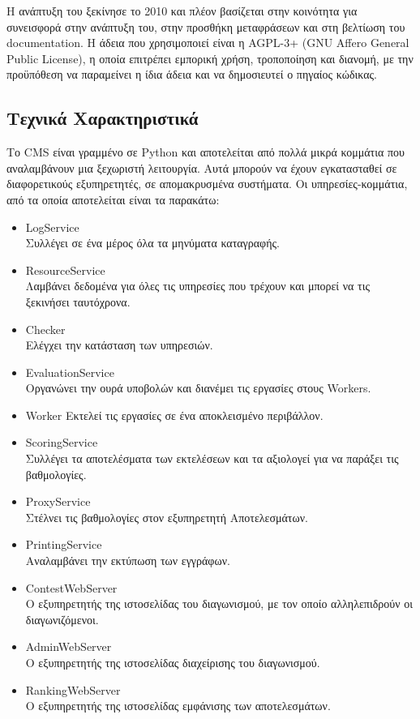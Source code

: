 \documentclass[diploma]{softlab-thesis}
\begin{document}
\bigskip

Η ανάπτυξη του ξεκίνησε το 2010 και πλέον βασίζεται στην κοινότητα για
συνεισφορά στην ανάπτυξη του, στην προσθήκη μεταφράσεων και στη βελτίωση του
documentation. H άδεια που χρησιμοποιεί είναι η AGPL-3+ (GNU Affero General
Public License), η οποία επιτρέπει εμπορική χρήση, τροποποίηση και διανομή, με
την προϋπόθεση να παραμείνει η ίδια άδεια και να δημοσιευτεί ο πηγαίος κώδικας.

\subsection{Τεχνικά Χαρακτηριστικά}

Το CMS είναι γραμμένο σε Python και αποτελείται από πολλά μικρά κομμάτια που
αναλαμβάνουν μια ξεχωριστή λειτουργία. Αυτά μπορούν να έχουν εγκατασταθεί σε
διαφορετικούς εξυπηρετητές, σε απομακρυσμένα συστήματα. Οι υπηρεσίες-κομμάτια, από
τα οποία αποτελείται είναι τα παρακάτω:

\begin{itemize}
    \setlength\itemsep{0em}
    \item LogService \\
      Συλλέγει σε ένα μέρος όλα τα μηνύματα καταγραφής.
    \item ResourceService \\
      Λαμβάνει δεδομένα για όλες τις υπηρεσίες που τρέχουν και μπορεί να τις
      ξεκινήσει ταυτόχρονα.
    \item Checker \\
      Ελέγχει την κατάσταση των υπηρεσιών.
    \item EvaluationService \\
      Οργανώνει την ουρά υποβολών και διανέμει τις εργασίες στους Workers.
    \item Worker
      Εκτελεί τις εργασίες σε ένα αποκλεισμένο περιβάλλον.
    \item ScoringService \\
      Συλλέγει τα αποτελέσματα των εκτελέσεων και τα αξιολογεί για να παράξει
      τις βαθμολογίες.
    \item ProxyService \\
      Στέλνει τις βαθμολογίες στον εξυπηρετητή Αποτελεσμάτων.
    \item PrintingService \\
      Αναλαμβάνει την εκτύπωση των εγγράφων.
    \item ContestWebServer \\
      Ο εξυπηρετητής της ιστοσελίδας του διαγωνισμού, με τον οποίο αλληλεπιδρούν
      οι διαγωνιζόμενοι.
    \item AdminWebServer \\
      Ο εξυπηρετητής της ιστοσελίδας διαχείρισης του διαγωνισμού.
    \item RankingWebServer \\
      Ο εξυπηρετητής της ιστοσελίδας εμφάνισης των αποτελεσμάτων.
\end{itemize}
\end{document}
